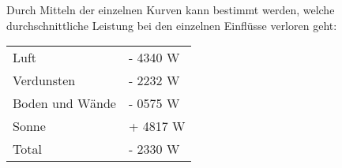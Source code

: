 Durch Mitteln der einzelnen Kurven kann bestimmt werden, welche durchschnittliche Leistung bei den einzelnen Einflüsse verloren geht:
\begin{table}[h]
	\begin{tabular}{ll}
		Luft              & - 4340 W                                 \\
		Verdunsten        & - 2232 W                                 \\
		Boden und Wände   & - 0575 W                                 \\
		Sonne             & + 4817 W         						 \\ \hline
		Total			  & - 2330 W
	\end{tabular}                                                           
\end{table}



